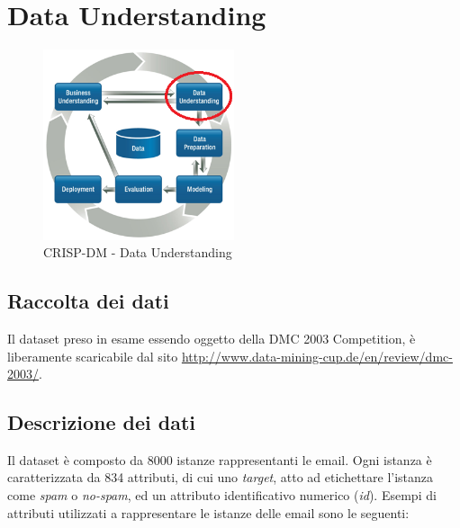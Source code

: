 \chapter{Data Understanding}
\begin{figure}[hbtp]
	\centering
	\includegraphics[width=0.5\textwidth]{./images/CRISPDM_2.png}
	\caption{CRISP-DM - Data Understanding}
	\label{CRISPDM_2}
\end{figure}
\section{Raccolta dei dati}
Il dataset preso in esame essendo oggetto della DMC 2003 Competition, è liberamente scaricabile dal sito \url{http://www.data-mining-cup.de/en/review/dmc-2003/}. 

\section{Descrizione dei dati}
Il dataset è composto da 8000 istanze rappresentanti le email. Ogni istanza è caratterizzata da 834 attributi, di cui uno \textit{target}, atto ad etichettare l'istanza come \textit{spam} o \textit{no-spam}, ed un attributo identificativo numerico (\textit{id}). Esempi di attributi utilizzati a rappresentare le istanze delle email sono le seguenti:

